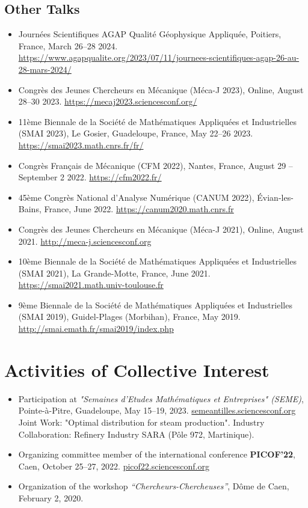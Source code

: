 \documentclass[10pt]{article}
\begin{document}
\subsection{Other Talks}
\begin{itemize}
\item Journées Scientifiques AGAP Qualité Géophysique Appliquée, Poitiers, France, March 26--28 2024. \url{https://www.agapqualite.org/2023/07/11/journees-scientifiques-agap-26-au-28-mars-2024/}
\item Congrès des Jeunes Chercheurs en Mécanique (Méca-J 2023), Online, August 28--30 2023. \url{https://mecaj2023.sciencesconf.org/}
\item 11ème Biennale de la Société de Mathématiques Appliquées et Industrielles (SMAI 2023), Le Gosier, Guadeloupe, France, May 22--26 2023. \url{https://smai2023.math.cnrs.fr/fr/}
\item Congrès Français de Mécanique (CFM 2022), Nantes, France, August 29 -- September 2 2022. \url{https://cfm2022.fr/}
\item 45ème Congrès National d'Analyse Numérique (CANUM 2022), Évian-les-Bains, France, June 2022. \url{https://canum2020.math.cnrs.fr}
\item Congrès des Jeunes Chercheurs en Mécanique (Méca-J 2021), Online, August 2021. \url{http://meca-j.sciencesconf.org}
\item 10ème Biennale de la Société de Mathématiques Appliquées et Industrielles (SMAI 2021), La Grande-Motte, France, June 2021. \url{https://smai2021.math.univ-toulouse.fr}
\item 9ème Biennale de la Société de Mathématiques Appliquées et Industrielles (SMAI 2019), Guidel-Plages (Morbihan), France, May 2019. \url{http://smai.emath.fr/smai2019/index.php}
\end{itemize}


\section{Activities of Collective Interest}

\begin{itemize}
  \item Participation at \textit{"Semaines d'Etudes Mathématiques et Entreprises" (SEME)},  
  Pointe-à-Pitre, Guadeloupe, May 15–19, 2023.  
  \href{https://semeantilles.sciencesconf.org/}{semeantilles.sciencesconf.org}  
  Joint Work: "Optimal distribution for steam production".
  Industry Collaboration: Refinery Industry SARA (Pôle 972, Martinique).

  \item Organizing committee member of the international conference \textbf{PICOF’22},  
  Caen, October 25–27, 2022.  
  \href{https://picof22.sciencesconf.org/}{picof22.sciencesconf.org}

  \item Organization of the workshop \textit{“Chercheurs-Chercheuses”},  
  Dôme de Caen, February 2, 2020.
\end{itemize}
\end{document}
